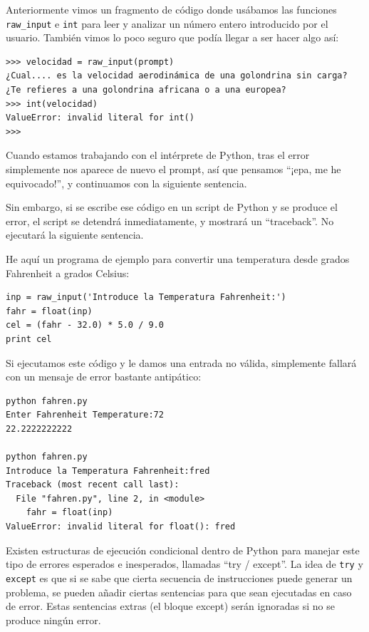 Anteriormente vimos un fragmento de código donde usábamos las funciones \verb"raw_input" e
{\tt int} para leer y analizar un número entero introducido por
el usuario. También vimos lo poco seguro que podía llegar a ser hacer algo así:

\beforeverb
\begin{verbatim}
>>> velocidad = raw_input(prompt)
¿Cual.... es la velocidad aerodinámica de una golondrina sin carga?
¿Te refieres a una golondrina africana o a una europea?
>>> int(velocidad)
ValueError: invalid literal for int()
>>>
\end{verbatim}
\afterverb
%
Cuando estamos trabajando con el intérprete de Python, tras el error simplemente
nos aparece de nuevo el prompt, así que pensamos ``¡epa, me he equivocado!'', y continuamos
con la siguiente sentencia.

Sin embargo, si se escribe ese código en un
script de Python y se produce el error, el script se detendrá
inmediatamente, y mostrará un ``traceback''.
No ejecutará la siguiente sentencia.


He aquí un programa de ejemplo para convertir una temperatura
desde grados Fahrenheit a grados Celsius:


\beforeverb
\begin{verbatim}
inp = raw_input('Introduce la Temperatura Fahrenheit:')
fahr = float(inp)
cel = (fahr - 32.0) * 5.0 / 9.0
print cel
\end{verbatim}
\afterverb
%
Si ejecutamos este código y le damos una entrada no válida, simplemente
fallará con un mensaje de error bastante antipático:

\beforeverb
\begin{verbatim}
python fahren.py 
Enter Fahrenheit Temperature:72
22.2222222222

python fahren.py 
Introduce la Temperatura Fahrenheit:fred
Traceback (most recent call last):
  File "fahren.py", line 2, in <module>
    fahr = float(inp)
ValueError: invalid literal for float(): fred
\end{verbatim}
\afterverb
%
Existen estructuras de ejecución condicional dentro de
Python para manejar este tipo de errores esperados e
inesperados, llamadas ``try / except''. La idea de {\tt try}
y {\tt except} es que si se sabe que cierta secuencia
de instrucciones puede generar un problema, se pueden
añadir ciertas sentencias para que sean ejecutadas en caso de error.
Estas sentencias extras (el bloque except) serán ignoradas
si no se produce ningún error.

